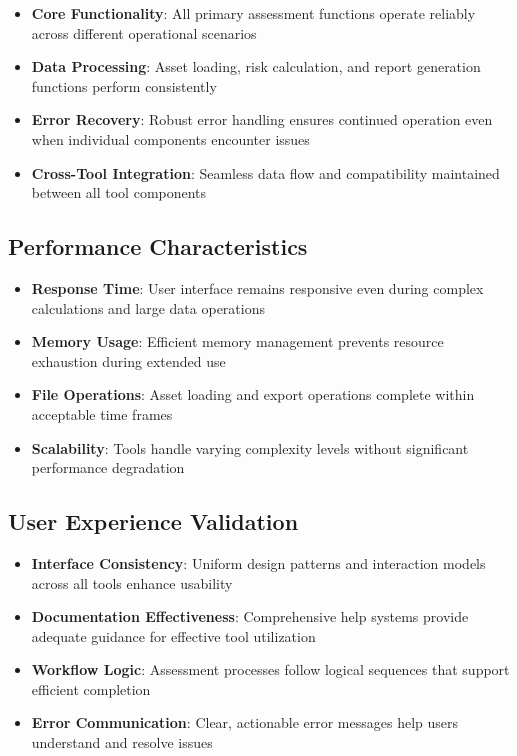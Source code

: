 \documentclass[binding=0.6cm]{sapthesis}
\begin{document}
\begin{itemize}
    \item \textbf{Core Functionality}: All primary assessment functions operate reliably across different operational scenarios
    \item \textbf{Data Processing}: Asset loading, risk calculation, and report generation functions perform consistently
    \item \textbf{Error Recovery}: Robust error handling ensures continued operation even when individual components encounter issues
    \item \textbf{Cross-Tool Integration}: Seamless data flow and compatibility maintained between all tool components
\end{itemize}

\subsection{Performance Characteristics}

\begin{itemize}
    \item \textbf{Response Time}: User interface remains responsive even during complex calculations and large data operations
    \item \textbf{Memory Usage}: Efficient memory management prevents resource exhaustion during extended use
    \item \textbf{File Operations}: Asset loading and export operations complete within acceptable time frames
    \item \textbf{Scalability}: Tools handle varying complexity levels without significant performance degradation
\end{itemize}

\subsection{User Experience Validation}

\begin{itemize}
    \item \textbf{Interface Consistency}: Uniform design patterns and interaction models across all tools enhance usability
    \item \textbf{Documentation Effectiveness}: Comprehensive help systems provide adequate guidance for effective tool utilization
    \item \textbf{Workflow Logic}: Assessment processes follow logical sequences that support efficient completion
    \item \textbf{Error Communication}: Clear, actionable error messages help users understand and resolve issues
\end{itemize}
\end{document}
